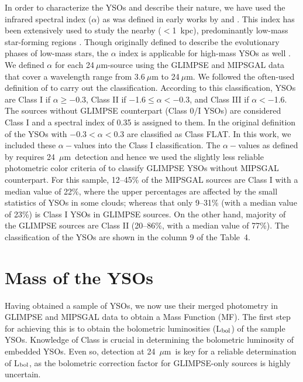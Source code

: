 \documentclass[iop]{emulateapj}
\newcommand{\mum}{$\mu$m}
\newcommand{\lbol}{L$_{\rm bol}$}
\newcommand{\mipslam}{24~$\mu$m}
\begin{document}
In order to characterize the YSOs and describe their nature,
we have used the infrared spectral index ($\alpha$) as was
defined in early works by \citet{lada+84} and \citet{lada87}. This index has
been extensively used to study the nearby ($<$1~kpc), predominantly
low-mass star-forming regions 
\citep{hartmann+05,harvey+06,alcala+08,gutermuth+08}.
Though originally defined to describe the evolutionary phases
of low-mass stars, the $\alpha$ index is applicable for 
high-mass YSOs as well \citep{deharveng+12,ellerbroek+13,saral+15}.
We defined $\alpha$ for each 24$~\mu$m-source using the GLIMPSE 
and MIPSGAL data that cover a wavelength range from 3.6$~\mu$m to 24$~\mu$m. 
We followed the often-used definition of \citet{green+94} to carry out the
classification. According to this classification, YSOs are Class I
if $\alpha\geq-$0.3, Class II if $-$1.6$\leq\alpha<-$0.3, and Class III
if $\alpha<-$1.6. 
The sources without GLIMPSE counterpart (Class 0/I YSOs) are 
considered Class I and a spectral index of 0.35 is assigned to them. In the 
original definition of \citet{green+94} the YSOs with $-$0.3$<\alpha<$0.3 
are classified as Class FLAT. In this 
work, we included these $\alpha-$values into the Class I classification. 
The $\alpha-$values as defined by \citet{green+94} requires \mipslam\   
detection and hence we used the slightly less reliable photometric color 
criteria of \citet{gutermuth+08} to classify GLIMPSE YSOs without 
MIPSGAL counterpart.  For this sample, 
12--45\% of the MIPSGAL sources are Class I with a median value 
of 22\%, where the upper percentages are affected by the small 
statistics of YSOs in some clouds; whereas that only 9--31\% (with a 
median value of 23\%) is Class I YSOs in GLIMPSE sources. On the 
other hand,  majority of the GLIMPSE sources are Class II (20--86\%, 
with a median value of 77\%). 
The classification of the YSOs are shown in the column 9 of the Table~4.

\section{Mass of the YSOs}

Having obtained a sample of YSOs, we now use their merged
photometry in GLIMPSE and MIPSGAL data to obtain a Mass Function (MF). 
The first step for achieving this is
to obtain the bolometric luminosities (\lbol) of the sample YSOs. 
Knowledge of Class is crucial in determining the bolometric luminosity of 
embedded YSOs. Even so, detection at 24~\mum\ is key for a reliable 
determination of \lbol, as the bolometric correction factor for GLIMPSE-only sources 
is highly uncertain. 
\end{document}
